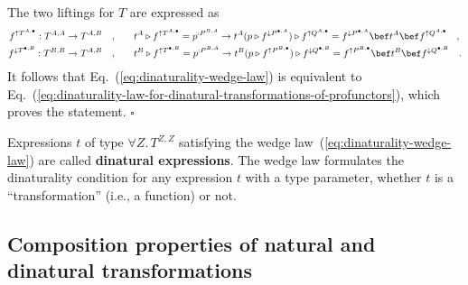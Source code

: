 The two liftings for $T$ are expressed as
\begin{align*}
f^{\uparrow T^{A,\bullet}}:T^{A,A}\rightarrow T^{A,B}\quad, & \quad\quad t^{A}\triangleright f^{\uparrow T^{A,\bullet}}=p^{:P^{B,A}}\rightarrow t^{A}(p\triangleright f^{\downarrow P^{\bullet,A}})\triangleright f^{\uparrow Q^{A,\bullet}}=f^{\downarrow P^{\bullet,A}}\bef t^{A}\bef f^{\uparrow Q^{A,\bullet}}\quad,\\
f^{\downarrow T^{\bullet,B}}:T^{B,B}\rightarrow T^{A,B}\quad, & \quad\quad t^{B}\triangleright f^{\uparrow T^{\bullet,B}}=p^{:P^{B,A}}\rightarrow t^{B}(p\triangleright f^{\uparrow P^{B,\bullet}})\triangleright f^{\downarrow Q^{\bullet,B}}=f^{\uparrow P^{B,\bullet}}\bef t^{B}\bef f^{\downarrow Q^{\bullet,B}}\quad.
\end{align*}
It follows that Eq.~(\ref{eq:dinaturality-wedge-law}) is equivalent
to Eq.~(\ref{eq:dinaturality-law-for-dinatural-transformations-of-profunctors}),
which proves the statement. $\square$

Expressions $t$ of type $\forall Z.\,T^{Z,Z}$ satisfying the wedge
law~(\ref{eq:dinaturality-wedge-law}) are called \textbf{dinatural
expressions}. The wedge law formulates
the dinaturality condition for any expression $t$ with a type parameter,
whether $t$ is a \textsf{``}transformation\textsf{''} (i.e., a function) or not.

\subsection{Composition properties of natural and dinatural transformations\label{subsec:Composition-properties-of-dinatural}}

